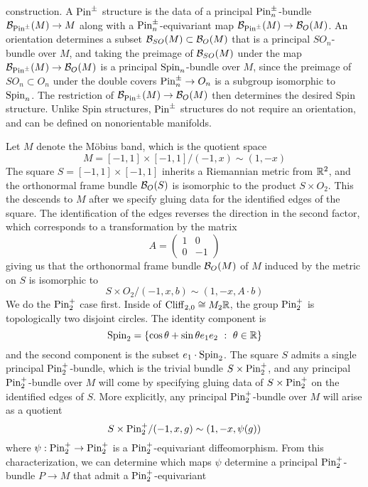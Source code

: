 construction. A $\mathrm{Pin}^\pm$ structure is the data of a principal
$\mathrm{Pin}^\pm_n$-bundle $\mathcal{B}_{\mathrm{Pin}^\pm}(M) \to M$ along with a
$\mathrm{Pin}^\pm_n$-equivariant map $\mathcal{B}_{\mathrm{Pin}^\pm}(M) \to \mathcal{B}_O(M)$. An orientation
determines a subset $\mathcal{B}_{SO}(M) \subset \mathcal{B}_O(M)$ that is a principal
$SO_n$-bundle over $M$, and taking the preimage of $\mathcal{B}_{SO}(M)$ under the
map $\mathcal{B}_{\mathrm{Pin}^\pm}(M) \to \mathcal{B}_O(M)$ is a principal $\mathrm{Spin}_n$-bundle over $M$,
since the preimage of $SO_n \subset O_n$ under the double covers
$\mathrm{Pin}^\pm_n \to O_n$ is a subgroup isomorphic to $\mathrm{Spin}_n$.
The restriction of $\mathcal{B}_{\mathrm{Pin}^\pm}(M) \to \mathcal{B}_O(M)$ then determines the
desired Spin structure.
%
Unlike Spin structures, $\mathrm{Pin}^\pm$ structures do not require an orientation,
and can be defined on nonorientable manifolds.
%
\begin{exmp}
Let $M$ denote the M\"obius band, which is the quotient space
\[
M = [-1,1] \times [-1,1] / (-1, x) \sim (1, -x)
\]
The square $S = [-1,1] \times [-1,1]$ inherits a Riemannian metric from $\mathbb{R}^2$,
and the orthonormal frame bundle $\mathcal{B}_O(S)$ is isomorphic to
the product $S \times O_2$. This the descends to $M$ after
we specify gluing data for the identified edges of the square. The identification
of the edges reverses the direction in the second factor, which corresponds to
a transformation by the matrix
\[
A = \begin{pmatrix}
1 & 0 \\
0 & -1
\end{pmatrix}
\]
giving us that the orthonormal frame bundle $\mathcal{B}_O(M)$ of $M$ induced by the
metric on $S$ is isomorphic to
\[
S\times O_2 / (-1,x, b) \sim (1,-x, A \cdot b)
\]
We do the $\mathrm{Pin}^+_2$ case first. Inside of $\operatorname{Cliff}_{2,0} \cong M_2\mathbb{R}$,
the group $\mathrm{Pin}_2^+$ is topologically two disjoint circles. The identity component
is \[
\mathrm{Spin}_2 = \left\lbrace \cos\theta + \sin\theta e_1e_2 ~:~ \theta \in \mathbb{R} \right\rbrace
\]
and the second component is the subset $e_1 \cdot \mathrm{Spin}_2$. The square
$S$ admits a single principal $\mathrm{Pin}_2^+$-bundle, which is the trivial bundle
$S \times \mathrm{Pin}_2^+$, and any principal $\mathrm{Pin}_2^+$-bundle over $M$ will come
by specifying gluing data of $S \times \mathrm{Pin}_2^+$ on the identified edges of $S$.
More explicitly, any principal $\mathrm{Pin}_2^+$-bundle over $M$ will arise as a
quotient
\[
S \times \mathrm{Pin}_2^+ / (-1,x,g) \sim (1, -x, \psi(g))
\]
where $\psi : \mathrm{Pin}_2^+ \to \mathrm{Pin}_2^+$ is a $\mathrm{Pin}_2^+$-equivariant diffeomorphism.
From this characterization, we can determine which maps $\psi$ determine
a principal $\mathrm{Pin}^+_2$-bundle $P \to M$ that admit a $\mathrm{Pin}_2^+$-equivariant

\end{exmp}
